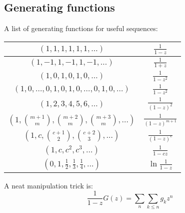 

\subsection{Generating functions}
  A list of generating functions for useful sequences:


  \begin{tabular}{|c|c|}
    \hline
    $(1,1,1,1,1,1,\ldots)$ & $\frac{1}{1-z}$ \\ \hline
    $(1,-1,1,-1,1,-1,\ldots)$ & $\frac{1}{1+z}$ \\ \hline
    $(1,0,1,0,1,0,\ldots)$ & $\frac{1}{1-z^2}$ \\ \hline
    $(1,0,\ldots,0,1,0,1,0,\ldots,0,1,0,\ldots)$ & $\frac{1}{1-z^2}$ \\ \hline
    $(1,2,3,4,5,6,\ldots)$ & $\frac{1}{(1-z)^2}$ \\ \hline
    $(1,\binom{m+1}{m},\binom{m+2}{m},\binom{m+3}{m},\ldots)$ & $\frac{1}{(1-z)^{m+1}}$ \\ \hline
    $(1,c,\binom{c+1}{2},\binom{c+2}{3},\ldots)$ & $\frac{1}{(1-z)^c}$ \\ \hline
    $(1,c,c^2, c^3, \ldots)$ & $\frac{1}{1-cz}$ \\ \hline
    $(0,1,\frac{1}{2},\frac{1}{3},\frac{1}{4},\ldots)$ & $\ln \frac{1}{1-z}$ \\ \hline
  \end{tabular}


A neat manipulation trick is:
\begin{equation*}
  \frac{1}{1-z}G(z) = \sum_{n}\sum_{k\leq n}g_kz^n
\end{equation*}


